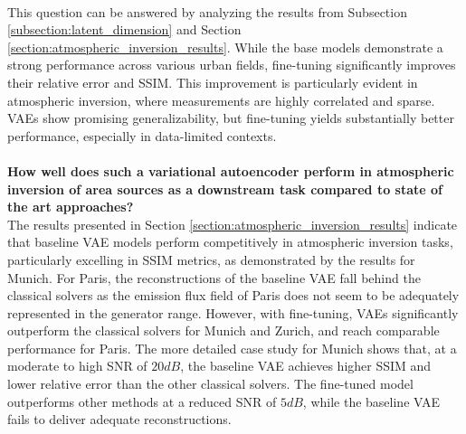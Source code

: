 \\
This question can be answered by analyzing the results from Subsection \ref{subsection:latent_dimension} and Section \ref{section:atmospheric_inversion_results}.
While the base models demonstrate a strong performance across various urban fields, fine-tuning significantly improves their relative error and \gls{SSIM}.
This improvement is particularly evident in atmospheric inversion, where measurements are highly correlated and sparse. \gls{VAE}s show promising generalizability, but fine-tuning yields substantially better performance, especially in data-limited contexts.
\\\\
\textbf{How well does such a variational autoencoder perform in atmospheric inversion of area sources as a downstream task compared to state of the art approaches?}
\\
The results presented in Section \ref{section:atmospheric_inversion_results} indicate that baseline \gls{VAE} models perform competitively in atmospheric inversion tasks, particularly excelling in \gls{SSIM} metrics, as demonstrated by the results for Munich.
For Paris, the reconstructions of the baseline \gls{VAE} fall behind the classical solvers as the emission flux field of Paris does not seem to be adequately represented in the generator range.
However, with fine-tuning, \gls{VAE}s significantly outperform the classical solvers for Munich and Zurich, and reach comparable performance for Paris.
The more detailed case study for Munich shows that, at a moderate to high \gls{SNR} of $20 \unit{dB}$, the baseline \gls{VAE} achieves higher \gls{SSIM} and lower relative error than the other classical solvers.
The fine-tuned model outperforms other methods at a reduced \gls{SNR} of $5 \unit{dB}$, while the baseline \gls{VAE} fails to deliver adequate reconstructions.
